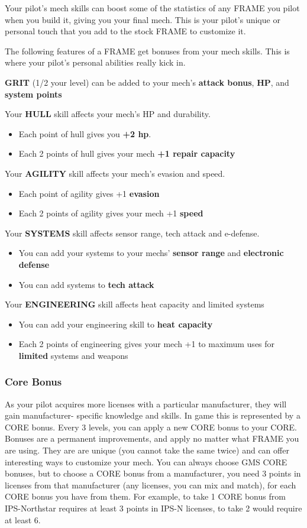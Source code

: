 Your pilot’s mech skills can boost some of the statistics of any FRAME you pilot when you build it, giving you your final mech. This is your pilot’s unique or personal touch that you add to the stock FRAME to customize it. 

The following features of a FRAME get bonuses from your mech skills. This is where your pilot’s personal abilities really kick in. 

\textbf{GRIT} (1/2 your level) can be added to your mech’s \textbf{attack bonus}, \textbf{HP}, and \textbf{system points} 


Your \textbf{HULL} skill affects your mech’s HP and durability.
\begin{itemize}
\item Each point of hull gives you \textbf{+2 hp}.
\item Each 2 points of hull gives your mech \textbf{+1 repair capacity} 
\end{itemize}
Your \textbf{AGILITY} skill affects your mech’s evasion and speed.
\begin{itemize}
\item Each point of agility gives +1 \textbf{evasion} 
\item Each 2 points of agility gives your mech +1 \textbf{speed} 
\end{itemize}
Your \textbf{SYSTEMS} skill affects sensor range, tech attack and e-defense.
\begin{itemize}
\item You can add your systems to your mechs’ \textbf{sensor range} and \textbf{electronic defense} 
\item You can add systems to \textbf{tech attack} 
\end{itemize}
Your \textbf{ENGINEERING} skill affects heat capacity and limited systems
\begin{itemize}
\item You can add your engineering skill to \textbf{heat capacity} 
\item Each 2 points of engineering gives your mech +1 to maximum uses for \textbf{limited} systems and weapons
\end{itemize}
       
\subsubsection{Core Bonus}

As your pilot acquires more licenses with a particular manufacturer, they will gain manufacturer- specific knowledge and skills. In game this is represented by a CORE bonus. Every 3 levels, you can apply a new CORE bonus to your CORE. Bonuses are a permanent improvements, and apply no matter what FRAME you are using. They are are unique (you cannot take the same twice) and can offer interesting ways to customize your mech. You can always choose GMS CORE bonuses, but to choose a CORE bonus from a manufacturer, you need 3 points in licenses from that manufacturer (any licenses, you can mix and match), for each CORE bonus you have from them. For example, to take 1 CORE bonus from IPS-Northstar requires at least 3 points in IPS-N licenses, to take 2 would require at least 6.

